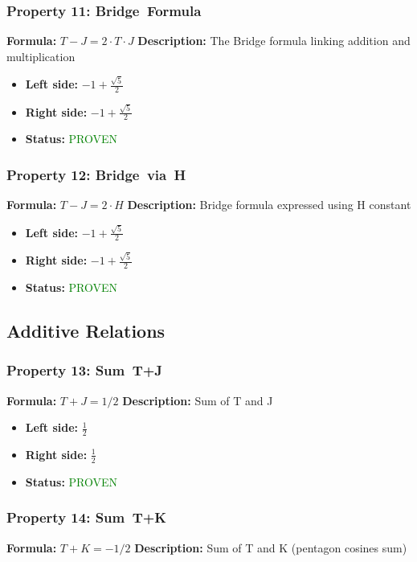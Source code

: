 \subsubsection*{Property 11: Bridge~Formula}
\textbf{Formula:} $T - J = 2 \cdot T \cdot J$
\textbf{Description:} The Bridge formula linking addition and multiplication

\begin{itemize}
\item \textbf{Left side:} $-1 + \frac{\sqrt{5}}{2}$
\item \textbf{Right side:} $-1 + \frac{\sqrt{5}}{2}$
\item \textbf{Status:} \textcolor{green}{PROVEN}
\end{itemize}

\subsubsection*{Property 12: Bridge~via~H}
\textbf{Formula:} $T - J = 2 \cdot H$
\textbf{Description:} Bridge formula expressed using H constant

\begin{itemize}
\item \textbf{Left side:} $-1 + \frac{\sqrt{5}}{2}$
\item \textbf{Right side:} $-1 + \frac{\sqrt{5}}{2}$
\item \textbf{Status:} \textcolor{green}{PROVEN}
\end{itemize}


\subsection{Additive Relations}

\subsubsection*{Property 13: Sum~T+J}
\textbf{Formula:} $T + J = 1/2$
\textbf{Description:} Sum of T and J

\begin{itemize}
\item \textbf{Left side:} $\frac{1}{2}$
\item \textbf{Right side:} $\frac{1}{2}$
\item \textbf{Status:} \textcolor{green}{PROVEN}
\end{itemize}

\subsubsection*{Property 14: Sum~T+K}
\textbf{Formula:} $T + K = -1/2$
\textbf{Description:} Sum of T and K (pentagon cosines sum)

